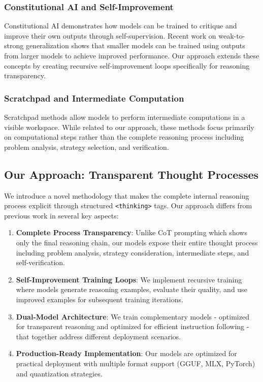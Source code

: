 \subsubsection{Constitutional AI and Self-Improvement}
Constitutional AI \cite{anthropic2022constitutional} demonstrates how models can be trained to critique and improve their own outputs through self-supervision. Recent work on weak-to-strong generalization \cite{burns2023weak} shows that smaller models can be trained using outputs from larger models to achieve improved performance. Our approach extends these concepts by creating recursive self-improvement loops specifically for reasoning transparency.

\subsubsection{Scratchpad and Intermediate Computation}
Scratchpad methods \cite{nye2021show} allow models to perform intermediate computations in a visible workspace. While related to our approach, these methods focus primarily on computational steps rather than the complete reasoning process including problem analysis, strategy selection, and verification.

\subsection{Our Approach: Transparent Thought Processes}

We introduce a novel methodology that makes the complete internal reasoning process explicit through structured \texttt{<thinking>} tags. Our approach differs from previous work in several key aspects:

\begin{enumerate}
    \item \textbf{Complete Process Transparency}: Unlike CoT prompting which shows only the final reasoning chain, our models expose their entire thought process including problem analysis, strategy consideration, intermediate steps, and self-verification.
    
    \item \textbf{Self-Improvement Training Loops}: We implement recursive training where models generate reasoning examples, evaluate their quality, and use improved examples for subsequent training iterations.
    
    \item \textbf{Dual-Model Architecture}: We train complementary models - \supra{} optimized for transparent reasoning and \zennano{} optimized for efficient instruction following - that together address different deployment scenarios.
    
    \item \textbf{Production-Ready Implementation}: Our models are optimized for practical deployment with multiple format support (GGUF, MLX, PyTorch) and quantization strategies.
\end{enumerate}

